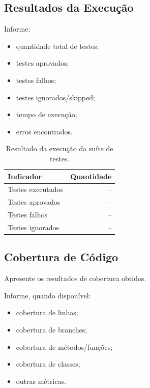 
\subsection{Resultados da Execução}

Informe:

\begin{itemize}
    \item quantidade total de testes;
    \item testes aprovados;
    \item testes falhos;
    \item testes ignorados/skipped;
    \item tempo de execução;
    \item erros encontrados.
\end{itemize}

\begin{table}[H]
\centering
\caption{Resultado da execução da suíte de testes.}
\label{tab:execucao}
\begin{tabular}{lr}
\toprule
\textbf{Indicador} & \textbf{Quantidade} \\
\midrule
Testes executados & -- \\
Testes aprovados & -- \\
Testes falhos & -- \\
Testes ignorados & -- \\
\bottomrule
\end{tabular}
\end{table}



\subsection{Cobertura de Código}

Apresente os resultados de cobertura obtidos.

Informe, quando disponível:

\begin{itemize}
    \item cobertura de linhas;
    \item cobertura de branches;
    \item cobertura de métodos/funções;
    \item cobertura de classes;
    \item outras métricas.
\end{itemize}

